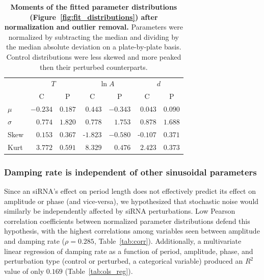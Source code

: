 \documentclass[11pt, letterpaper]{article}
\begin{document}
\begin{table}
  \begin{center}
    \begin{tabular}{lrrrrrr}\toprule
      {} & \multicolumn{2}{c}{$T$} & \multicolumn{2}{c}{$\ln A$} & \multicolumn{2}{c}{$d$} \\
      {}         & \multicolumn{1}{c}{C}         & \multicolumn{1}{c}{P}           & \multicolumn{1}{c}{C}         & \multicolumn{1}{c}{P}               & \multicolumn{1}{c}{C}         & \multicolumn{1}{c}{P}           \\\midrule
      $\mu$      & $-0.234$  & $0.187$  &  $0.443$  & $-0.343$  &  $0.043$  & $0.090$    \\
      $\sigma$   & $ 0.774$  & $1.820$  &  $0.778$  & $ 1.753$  &  $0.878$  & $1.688$    \\
      Skew & $ 0.153$  & $0.367$  & -$1.823$  & $-0.580$  & -$0.107$  & $0.371$    \\
      Kurt & $ 3.772$  & $0.591$  &  $8.329$  & $ 0.476$  &  $2.423$  & $0.373$    \\
      \bottomrule
    \end{tabular}
  \end{center}
  \caption{{\bfseries Moments of the fitted parameter distributions (Figure~\ref{fig:fit_distributions}) after normalization and outlier removal.} Parameters were normalized by subtracting the median and dividing by the median absolute deviation on a plate-by-plate basis. Control distributions were less skewed and more peaked then their perturbed counterparts.}
  \label{tab:fit_distributions}
\end{table}

\subsubsection*{Damping rate is independent of other sinusoidal parameters}

Since an siRNA's effect on period length does not effectively predict its effect on amplitude or phase (and vice-versa), we hypothesized that stochastic noise would similarly be independently affected by siRNA perturbations.
Low Pearson correlation coefficients between normalized parameter distributions defend this hypothesis, with the highest correlations among variables seen between amplitude and damping rate ($\rho = 0.285$, Table~\ref{tab:corr}).
Additionally, a multivariate linear regression of damping rate as a function of period, amplitude, phase, and perturbation type (control or perturbed, a categorical variable) produced an $R^2$ value of only $0.169$ (Table~\ref{tab:ols_reg}).
\end{document}
